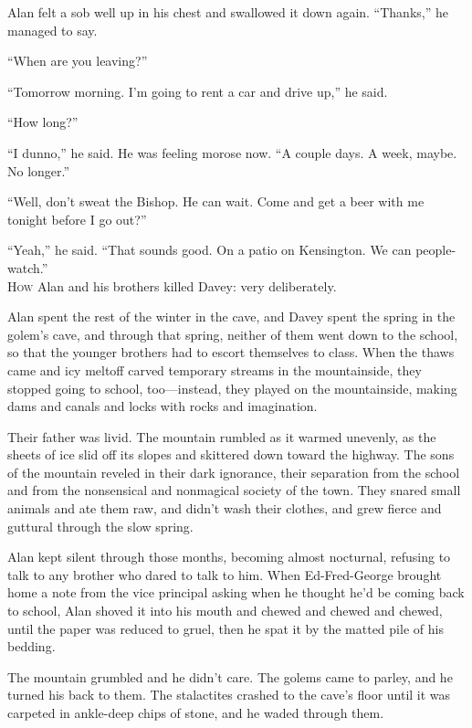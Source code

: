 Alan felt a sob well up in his chest and swallowed it down again. 
``Thanks,'' he managed to say.

``When are you leaving?''

``Tomorrow morning.  I'm going to rent a car and drive up,'' he said.

``How long?''

``I dunno,'' he said.  He was feeling morose now.  ``A couple days.  A
week, maybe.  No longer.''

``Well, don't sweat the Bishop.  He can wait.  Come and get a beer
with me tonight before I go out?''

``Yeah,'' he said.  ``That sounds good.  On a patio on Kensington.  We
can people-watch.''
\\
\lettrine[lines=3, lhang=.5, nindent=0pt, findent=2pt]{H}{ow} Alan and his brothers killed Davey:  very deliberately.

Alan spent the rest of the winter in the cave, and Davey spent the
spring in the golem's cave, and through that spring, neither of them
went down to the school, so that the younger brothers had to escort
themselves to class.  When the thaws came and icy meltoff carved
temporary streams in the mountainside, they stopped going to school,
too---instead, they played on the mountainside, making dams and canals
and locks with rocks and imagination.

Their father was livid.  The mountain rumbled as it warmed unevenly,
as the sheets of ice slid off its slopes and skittered down toward the
highway.  The sons of the mountain reveled in their dark ignorance,
their separation from the school and from the nonsensical and
nonmagical society of the town.  They snared small animals and ate
them raw, and didn't wash their clothes, and grew fierce and guttural
through the slow spring.

Alan kept silent through those months, becoming almost nocturnal,
refusing to talk to any brother who dared to talk to him.  When
Ed-Fred-George brought home a note from the vice principal asking when
he thought he'd be coming back to school, Alan shoved it into his
mouth and chewed and chewed and chewed, until the paper was reduced to
gruel, then he spat it by the matted pile of his bedding.

The mountain grumbled and he didn't care.  The golems came to parley,
and he turned his back to them.  The stalactites crashed to the cave's
floor until it was carpeted in ankle-deep chips of stone, and he waded
through them.

